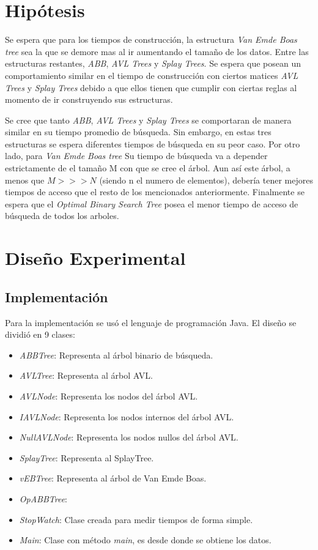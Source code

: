 \documentclass[letterpaper,12pt]{article}
\begin{document}
\section{Hipótesis}

Se espera que para los tiempos de construcción, la estructura \textit{Van Emde Boas tree} sea la que se demore mas al ir aumentando el tamaño de los datos. Entre las estructuras restantes, \textit{ABB}, \textit{AVL Trees} y \textit{Splay Trees}. Se espera que posean un comportamiento similar en el tiempo de construcción con ciertos matices \textit{AVL Trees} y \textit{Splay Trees} debido a que ellos tienen que cumplir con ciertas reglas al momento de ir construyendo sus estructuras.

Se cree que tanto \textit{ABB}, \textit{AVL Trees} y \textit{Splay Trees} se comportaran de manera similar en su tiempo promedio de búsqueda. Sin embargo, en estas tres estructuras se espera diferentes tiempos de búsqueda en su peor caso. Por otro lado, para \textit{Van Emde Boas tree} Su tiempo de búsqueda va a depender estrictamente de el tamaño M con que se cree el árbol. Aun así este árbol, a menos que $M>>>N$ (siendo n el numero de elementos), debería tener mejores tiempos de acceso que el resto de los mencionados anteriormente. Finalmente se espera que el \textit{Optimal Binary Search Tree} posea el menor tiempo de acceso de búsqueda de todos los arboles.

\newpage
\section{Dise\~no Experimental}
\subsection{Implementaci\'on}
Para la implementaci\'on se us\'o el lenguaje de programaci\'on Java. El dise\~no se dividi\'o en 9 clases:

\begin{itemize}
\item \textit{ABBTree}: Representa al árbol binario de búsqueda.
\item \textit{AVLTree}: Representa al árbol AVL.
\item \textit{AVLNode}: Representa los nodos del árbol AVL.
\item \textit{IAVLNode}: Representa los nodos internos del árbol AVL.
\item \textit{NullAVLNode}: Representa los nodos nullos del árbol AVL.
\item \textit{SplayTree}: Representa al SplayTree.
\item \textit{vEBTree}: Representa al árbol de Van Emde Boas.
\item \textit{OpABBTree}:

\item \textit{StopWatch}: Clase creada para medir tiempos de forma simple.
\item \textit{Main}: Clase con m\'etodo \textit{main}, es desde donde se obtiene los datos.
\end{itemize}
\end{document}
